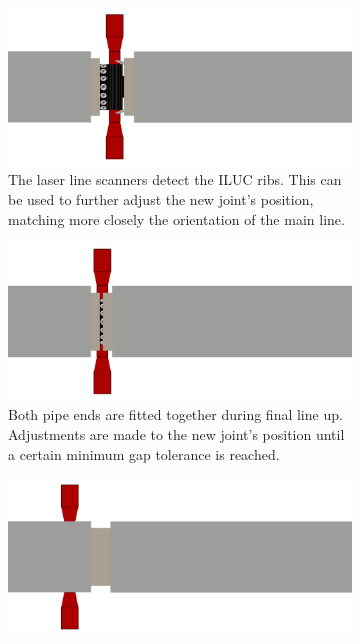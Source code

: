 \begin{figure}[H]
    \ContinuedFloat\centering
    \begin{subfigure}{0.7\textwidth}
        \includegraphics[width=\textwidth ]{images/lua_oop_ILUC_ribs.png}
        \caption{The laser line scanners detect the ILUC ribs. This can be used to further adjust the new joint's position,
            matching more closely the orientation of the main line.}
        \label{fig:oop_ILUC_ribs}
    \end{subfigure}
    \begin{subfigure}{0.7\textwidth}
        \includegraphics[width=\textwidth ]{images/lua_oop_final_line_up.png}
        \caption{Both pipe ends are fitted together during final line up. Adjustments are made to the new joint's position
            until a certain minimum gap tolerance is reached.}
        \label{fig:oop_final_line_up}
    \end{subfigure}
    \begin{subfigure}{0.7\textwidth}
        \includegraphics[width=\textwidth ]{images/lua_oop_end.png}

\end{subfigure}
\end{figure}
